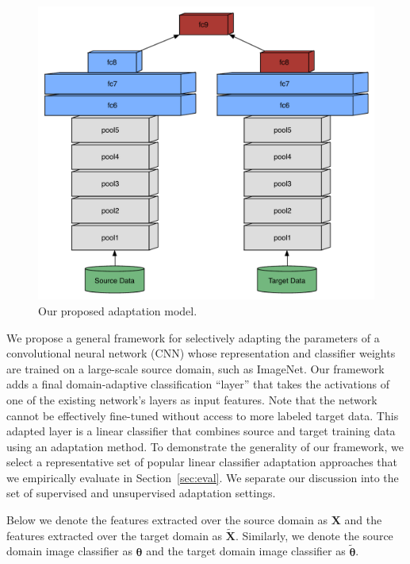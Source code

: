 
\newcommand{\svmT}{\bm{\theta}}
\newcommand{\svmB}{b}
\newcommand{\svmAug}{\tilde{\svmT}}
\newcommand{\svmAugAll}{\bm{\Theta}}

\begin{figure}
\begin{center}
\includegraphics[width=.7\linewidth]{figs/model-adapt}
\end{center}
\caption{Our proposed adaptation model.}
\label{fig:model}
\end{figure}


We propose a general framework for selectively adapting the parameters of a convolutional neural network (CNN) whose representation and classifier weights are trained on a large-scale source domain, such as ImageNet.
Our framework adds a final domain-adaptive classification ``layer'' that takes the activations of one of the existing network's layers as input features. Note that the network cannot be effectively fine-tuned without access to more labeled target data. This adapted layer is a linear classifier that combines source and target training data using an adaptation method. To demonstrate the generality of our framework, we select a representative set of popular linear classifier adaptation approaches that we empirically evaluate in Section~\ref{sec:eval}. We separate our discussion into the set of supervised and unsupervised adaptation settings.

Below we denote the features extracted over the source domain as $\bm{X}$ and the features extracted over the target domain as $\tilde{\bm{X}}$. Similarly, we denote the source domain image classifier as $\bm{\theta}$ and the target domain image classifier as $\bm{\tilde{\theta}}$.

